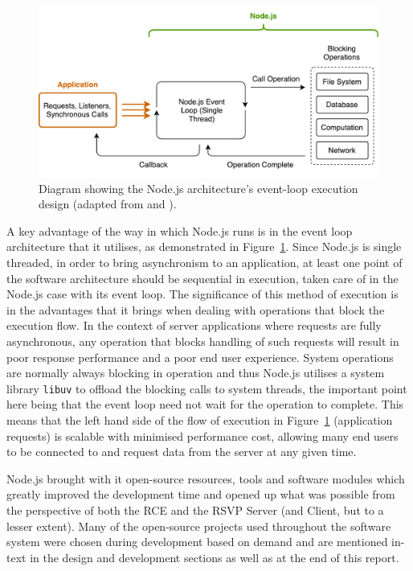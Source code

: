         \begin{figure}[h!]
          \centering
          \includegraphics[width=0.8\linewidth]{figures/softDesign-nodeEventLoop}
          \caption[Diagram showing the Node.js architecture's event-loop execution design.]{Diagram showing the Node.js architecture's event-loop execution design (adapted from \cite{fig:softDesign-nodeEventLoop_cite1} and \cite{fig:softDesign-nodeEventLoop_cite2}).}
          \label{fig:softDesign-nodeEventLoop}
        \end{figure}
        
        A key advantage of the way in which Node.js runs is in the event loop architecture that it utilises, as demonstrated in Figure~\ref{fig:softDesign-nodeEventLoop}. Since Node.js is single threaded, in order to bring asynchronism to an application, at least one point of the software architecture should be sequential in execution, taken care of in the Node.js case with its event loop. The significance of this method of execution is in the advantages that it brings when dealing with operations that block the execution flow. In the context of server applications where requests are fully asynchronous, any operation that blocks handling of such requests will result in poor response performance and a poor end user experience. System operations are normally always blocking in operation and thus Node.js utilises a system library \texttt{libuv} to offload the blocking calls to system threads, the important point here being that the event loop need not wait for the operation to complete. This means that the left hand side of the flow of execution in Figure~\ref{fig:softDesign-nodeEventLoop} (application requests) is scalable with minimised performance cost, allowing many end users to be connected to and request data from the server at any given time.
        
        Node.js brought with it open-source resources, tools and software modules which greatly improved the development time and opened up what was possible from the perspective of both the RCE and the RSVP Server (and Client, but to a lesser extent). Many of the open-source projects used throughout the software system were chosen during development based on demand and are mentioned in-text in the design and development sections as well as at the end of this report. %
        
